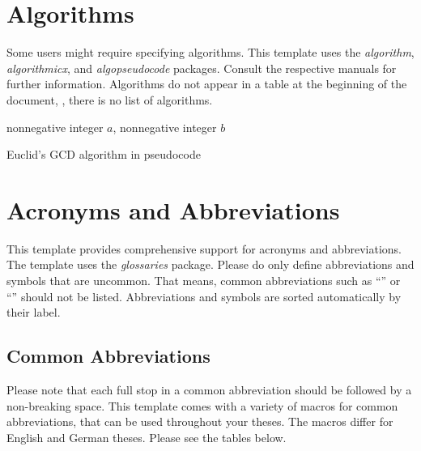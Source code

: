 \section{Algorithms}
Some users might require specifying algorithms. This template uses the \textit{algorithm}, \textit{algorithmicx}, and \textit{algopseudocode} packages. Consult the respective manuals for further information. Algorithms do not appear in a table at the beginning of the document, \ie, there is no list of algorithms.

\begin{algorithm}[htb]
	\begin{algorithmic}
		\Require nonnegative integer $a$, nonnegative integer $b$
		 
		\Else 
		\EndIf
		\EndFunction
	\end{algorithmic}
	\caption{Euclid's GCD algorithm in pseudocode}
	\label{alg:garbage}
\end{algorithm}

\section{Acronyms and Abbreviations}
This template provides comprehensive support for acronyms and abbreviations. The template uses the \textit{glossaries} package. 
Please do only define abbreviations and symbols that are uncommon. That means, common abbreviations such as \enquote{\eg} or \enquote{\ie} should not be listed. Abbreviations and symbols are sorted automatically by their label. 

\subsection{Common Abbreviations}
Please note that each full stop in a common abbreviation should be followed by a non-breaking space. This template comes with a variety of macros for common abbreviations, that can be used throughout your theses. The macros differ for English and German theses. Please see the tables below.

